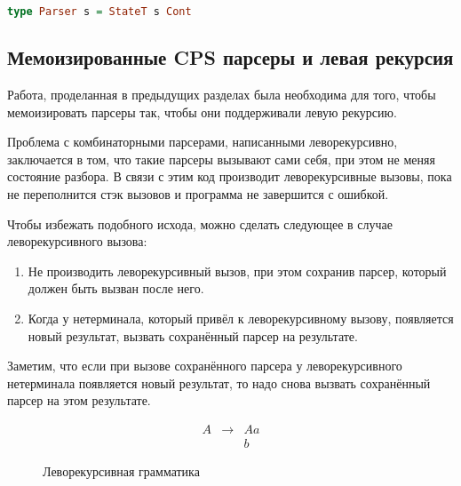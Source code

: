\documentclass[times]{itmo-student-thesis}
\begin{document}
\begin{lstlisting}[language=Haskell,float=!h,caption={Парсер в CPS стиле},label={lst:cps_parser}]
  type Parser s = StateT s Cont
\end{lstlisting}

\subsection{Мемоизированные CPS парсеры и левая рекурсия}\label{sec:memoized_cps_parser}

Работа, проделанная в предыдущих разделах была необходима для того, чтобы мемоизировать парсеры так, чтобы они поддерживали
левую рекурсию. 

Проблема с комбинаторными парсерами, написанными леворекурсивно, заключается в том, что такие парсеры вызывают сами
себя, при этом не меняя состояние разбора. В связи с этим код производит леворекурсивные вызовы, пока не переполнится стэк 
вызовов и программа не завершится с ошибкой.

Чтобы избежать подобного исхода, можно сделать следующее в случае леворекурсивного вызова:
\begin{enumerate}
    \item Не производить леворекурсивный вызов, при этом сохранив парсер, который должен быть вызван после него.
    \item Когда у нетерминала, который привёл к леворекурсивному вызову, появляется новый результат, вызвать сохранённый парсер
          на результате.
\end{enumerate}
Заметим, что если при вызове сохранённого парсера у леворекурсивного нетерминала появляется новый результат, то надо
снова вызвать сохранённый парсер на этом результате. 

\begin{figure}[!h]
  \caption{Леворекурсивная грамматика}\label{leftrec_grammar_cps}
  \[
      \begin{array}{lll}
          A & \to & Aa \\
            &     & b
      \end{array}
  \]
\end{figure}
\end{document}
